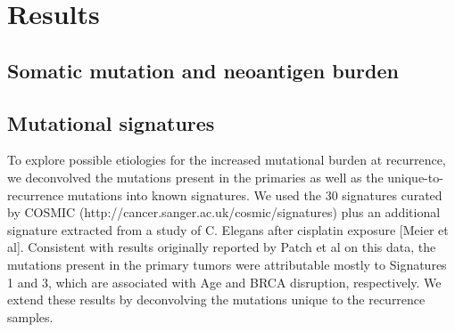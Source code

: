\section*{Results}
\subsection*{Somatic mutation and neoantigen burden}



\subsection*{Mutational signatures}
To explore possible etiologies for the increased mutational burden at recurrence, we deconvolved the mutations present in the primaries as well as the unique-to-recurrence mutations into known signatures. We used the 30 signatures curated by COSMIC (http://cancer.sanger.ac.uk/cosmic/signatures) plus an additional signature extracted from a study of C. Elegans after cisplatin exposure [Meier et al]. Consistent with results originally reported by Patch et al on this data, the mutations present in the primary tumors were attributable mostly to Signatures 1 and 3, which are associated with Age and BRCA disruption, respectively. We extend these results by deconvolving the mutations unique to the recurrence samples. 

